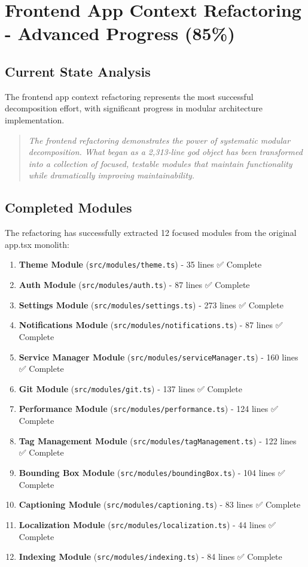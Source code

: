 \documentclass[11pt]{article}
\begin{document}
\section{Frontend App Context Refactoring - Advanced Progress (85\%)}

\subsection{Current State Analysis}

The frontend app context refactoring represents the most successful decomposition effort, with significant progress in modular architecture implementation.

\begin{quote}
\emph{The frontend refactoring demonstrates the power of systematic modular decomposition. What began as a 2,313-line god object has been transformed into a collection of focused, testable modules that maintain functionality while dramatically improving maintainability.}
\end{quote}

\subsection{Completed Modules}

The refactoring has successfully extracted 12 focused modules from the original app.tsx monolith:

\begin{enumerate}
\item \textbf{Theme Module} (\texttt{src/modules/theme.ts}) - 35 lines ✅ Complete
\item \textbf{Auth Module} (\texttt{src/modules/auth.ts}) - 87 lines ✅ Complete
\item \textbf{Settings Module} (\texttt{src/modules/settings.ts}) - 273 lines ✅ Complete
\item \textbf{Notifications Module} (\texttt{src/modules/notifications.ts}) - 87 lines ✅ Complete
\item \textbf{Service Manager Module} (\texttt{src/modules/serviceManager.ts}) - 160 lines ✅ Complete
\item \textbf{Git Module} (\texttt{src/modules/git.ts}) - 137 lines ✅ Complete
\item \textbf{Performance Module} (\texttt{src/modules/performance.ts}) - 124 lines ✅ Complete
\item \textbf{Tag Management Module} (\texttt{src/modules/tagManagement.ts}) - 122 lines ✅ Complete
\item \textbf{Bounding Box Module} (\texttt{src/modules/boundingBox.ts}) - 104 lines ✅ Complete
\item \textbf{Captioning Module} (\texttt{src/modules/captioning.ts}) - 83 lines ✅ Complete
\item \textbf{Localization Module} (\texttt{src/modules/localization.ts}) - 44 lines ✅ Complete
\item \textbf{Indexing Module} (\texttt{src/modules/indexing.ts}) - 84 lines ✅ Complete
\end{enumerate}
\end{document}
